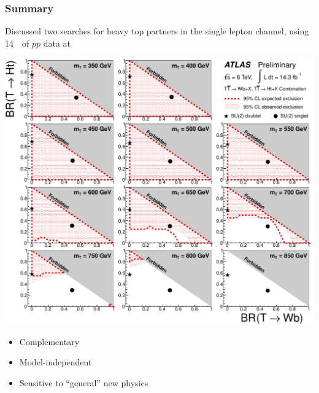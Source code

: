 
\begin{frame}\frametitle{Summary}
\footnotesize\centering

\begin{minipage}{.7\textwidth}\centering

Discussed two searches for heavy top partners in the single lepton channel, using 14~\ifb\ of $pp$ data at ~\tev

\myskip

\begin{minipage}{.4\textwidth}\centering

\includegraphics[width=.9\textwidth]{pics/combo/lim_Scan2D_comb.pdf}

\end{minipage}\begin{minipage}{.5\textwidth}\centering

\begin{itemize}
\item Complementary
\item Model-independent
\item Sensitive to ``general'' new physics
\end{itemize}

\end{minipage}


\end{minipage}

\myskip


\end{frame}

